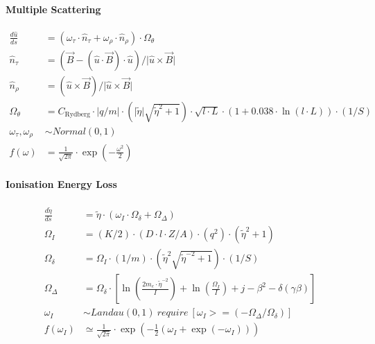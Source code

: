 \documentclass[review]{elsarticle}
\begin{document}
\paragraph{Multiple Scattering}
\begin{equation} \begin{alignedat}{-1}
    \frac{d\hat{u}}{ds}&=(\omega_{\tau}\cdot\hat{n}_{\tau}+\omega_{\rho}\cdot\hat{n}_{\rho})\cdot\Omega_{\theta} \\
    \hat{n}_{\tau}&=(\vec{B}-(\hat{u}\cdot\vec{B})\cdot\hat{u})/\bigr|\hat{u}\times\vec{B}\bigl| \\
    \hat{n}_{\rho}&=(\hat{u}\times\vec{B})/\bigr|\hat{u}\times\vec{B}\bigl| \\
    \Omega_{\theta}&=C_{\text{Rydberg}}\cdot\bigl|q/m\bigr|\cdot(\bigl|\tilde{\eta}\bigr|\sqrt{\tilde{\eta}^{2}+1})\cdot\sqrt{l\cdot L}\cdot(1+0.038\cdot\ln{(l\cdot L)})\cdot(1/S)\\
    \omega_{\tau},\omega_{\rho}&\sim Normal\left(0,1\right) \\
    f\left(\omega\right)&=\frac{1}{\sqrt{2\pi}}\cdot\exp{\left(-\frac{\omega^{2}}{2}\right)}
\end{alignedat} \end{equation} 

\paragraph{Ionisation Energy Loss}
\begin{equation} \begin{alignedat}{-1}
    \frac{d\tilde{\eta}}{ds}&=\tilde{\eta}\cdot\left(\omega_{I}\cdot\Omega_{\delta}+\Omega_{\Delta}\right) \\
    \Omega_{I}&=(K/2)\cdot(D\cdot l\cdot Z/A)\cdot(q^{2})\cdot(\tilde{\eta}^{2}+1) \\
    \Omega_{\delta}&=\Omega_{I}\cdot(1/m)\cdot(\tilde{\eta}^{2}\sqrt{\tilde{\eta}^{-2}+1})\cdot(1/S) \\
    \Omega_{\Delta}&=\Omega_{\delta}\cdot\left[\ln{\left(\frac{2m_{e}\cdot \tilde{\eta}^{-2}}{I}\right)}+\ln{\left(\frac{\Omega_{I}}{I}\right)}+j-{\beta}^{2}-\delta(\gamma\beta)\right] \\
    \omega_{I}&\sim Landau\left(0,1\right)\ require\ \left[\omega_{I}>=(-\Omega_{\Delta}/\Omega_{\delta})\right] \\
    f\left(\omega_{I}\right)&\simeq\frac{1}{\sqrt{2\pi}}\cdot\exp{\left(-\frac{1}{2}\left(\omega_{I}+\exp{(-\omega_{I})}\right)\right)}
\end{alignedat} \end{equation} 
\end{document}
